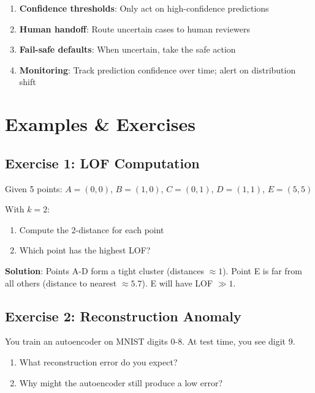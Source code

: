 \begin{enumerate}
    \item \textbf{Confidence thresholds}: Only act on high-confidence predictions
    \item \textbf{Human handoff}: Route uncertain cases to human reviewers
    \item \textbf{Fail-safe defaults}: When uncertain, take the safe action
    \item \textbf{Monitoring}: Track prediction confidence over time; alert on distribution shift
\end{enumerate}



\section{Examples \& Exercises}

\subsection{Exercise 1: LOF Computation}

Given 5 points: $A=(0,0)$, $B=(1,0)$, $C=(0,1)$, $D=(1,1)$, $E=(5,5)$

With $k=2$:
\begin{enumerate}
    \item Compute the 2-distance for each point
    \item Which point has the highest LOF?
\end{enumerate}

\textbf{Solution}: Points A-D form a tight cluster (distances $\approx 1$). Point E is far from all others (distance to nearest $\approx 5.7$). E will have LOF $\gg 1$.

\subsection{Exercise 2: Reconstruction Anomaly}

You train an autoencoder on MNIST digits 0-8. At test time, you see digit 9.

\begin{enumerate}
    \item What reconstruction error do you expect?
    \item Why might the autoencoder still produce a low error?
\end{enumerate}

